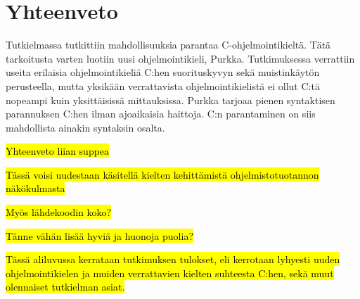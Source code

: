 \section{Yhteenveto}

Tutkielmassa tutkittiin mahdollisuuksia parantaa C-ohjelmointikieltä. Tätä
tarkoitusta varten luotiin uusi ohjelmointikieli, Purkka. Tutkimuksessa
verrattiin useita erilaisia ohjelmointikieliä C:hen suorituskyvyn sekä
muistinkäytön perusteella, mutta yksikään verrattavista ohjelmointikielistä ei
ollut C:tä nopeampi kuin yksittäisissä mittauksissa. Purkka tarjoaa pienen
syntaktisen parannuksen C:hen ilman ajoaikaisia haittoja. C:n parantaminen on
siis mahdollista ainakin syntaksin osalta.

\hl{Yhteenveto liian suppea}

\hl{Tässä voisi uudestaan käsitellä kielten kehittämistä ohjelmistotuotannon näkökulmasta }

\hl{Myös lähdekoodin koko?}

\hl{Tänne vähän lisää hyviä ja huonoja puolia?}

\hl{Tässä aliluvussa kerrataan tutkimuksen tulokset, eli kerrotaan lyhyesti
uuden ohjelmointikielen ja muiden verrattavien kielten suhteesta C:hen, sekä
muut olennaiset tutkielman asiat.}
